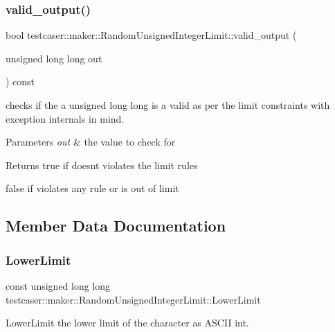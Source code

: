 \subsubsection{\texorpdfstring{valid\_output()}{valid\_output()}}
{\footnotesize\ttfamily bool testcaser\+::maker\+::\+Random\+Unsigned\+Integer\+Limit\+::valid\+\_\+output (\begin{DoxyParamCaption}\item[{unsigned long long}]{out }\end{DoxyParamCaption}) const\hspace{0.3cm}{\ttfamily [inline]}}



checks if the a unsigned long long is a valid as per the limit constraints with exception internals in mind. 


\begin{DoxyParams}{Parameters}
{\em out} & the value to check for \\
\hline
\end{DoxyParams}
\begin{DoxyReturn}{Returns}
true if doesn\textquotesingle{}t violates the limit rules 

false if violates any rule or is out of limit 
\end{DoxyReturn}


\subsection{Member Data Documentation}
\mbox{\label{classtestcaser_1_1maker_1_1RandomUnsignedIntegerLimit_a78c820c6fa2a1e136a71141f5697ff7f}} 
\subsubsection{\texorpdfstring{LowerLimit}{LowerLimit}}
{\footnotesize\ttfamily const unsigned long long testcaser\+::maker\+::\+Random\+Unsigned\+Integer\+Limit\+::\+Lower\+Limit}



Lower\+Limit the lower limit of the character as A\+S\+C\+II int. 

\mbox{\label{classtestcaser_1_1maker_1_1RandomUnsignedIntegerLimit_a02335f6ed09e057b47b5c40b584c71fe}} 
